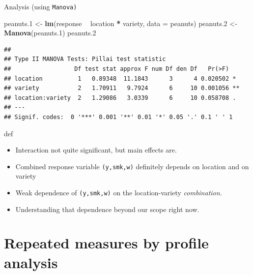 \documentclass[ignorenonframetext,]{beamer}
\newenvironment{Shaded}{\begin{snugshade}}{\end{snugshade}}
\newcommand{\DataTypeTok}[1]{\textcolor[rgb]{0.13,0.29,0.53}{#1}}
\newcommand{\FloatTok}[1]{\textcolor[rgb]{0.00,0.00,0.81}{#1}}
\newcommand{\KeywordTok}[1]{\textcolor[rgb]{0.13,0.29,0.53}{\textbf{#1}}}
\newcommand{\NormalTok}[1]{#1}
\newcommand{\OperatorTok}[1]{\textcolor[rgb]{0.81,0.36,0.00}{\textbf{#1}}}
\newcommand{\StringTok}[1]{\textcolor[rgb]{0.31,0.60,0.02}{#1}}
\begin{document}
\begin{frame}[fragile]{Analysis (using \texttt{Manova)}}
\protect\hypertarget{analysis-using-manova}{}

\begin{Shaded}
\begin{Highlighting}[]
\NormalTok{peanuts}\FloatTok{.1}\NormalTok{ <-}\StringTok{ }\KeywordTok{lm}\NormalTok{(response }\OperatorTok{~}\StringTok{ }\NormalTok{location }\OperatorTok{*}\StringTok{ }\NormalTok{variety, }\DataTypeTok{data =}\NormalTok{ peanuts)}
\NormalTok{peanuts}\FloatTok{.2}\NormalTok{ <-}\StringTok{ }\KeywordTok{Manova}\NormalTok{(peanuts}\FloatTok{.1}\NormalTok{)}
\NormalTok{peanuts}\FloatTok{.2}
\end{Highlighting}
\end{Shaded}

\begin{verbatim}
## 
## Type II MANOVA Tests: Pillai test statistic
##                  Df test stat approx F num Df den Df   Pr(>F)   
## location          1   0.89348  11.1843      3      4 0.020502 * 
## variety           2   1.70911   9.7924      6     10 0.001056 **
## location:variety  2   1.29086   3.0339      6     10 0.058708 . 
## ---
## Signif. codes:  0 '***' 0.001 '**' 0.01 '*' 0.05 '.' 0.1 ' ' 1
\end{verbatim}

def

\begin{itemize}
\item
  Interaction not quite significant, but main effects are.
\item
  Combined response variable \texttt{(y,smk,w)} definitely depends on
  location and on variety
\item
  Weak dependence of \texttt{(y,smk,w)} on the location-variety
  \emph{combination.}
\item
  Understanding that dependence beyond our scope right now.
\end{itemize}

\end{frame}

\hypertarget{repeated-measures-by-profile-analysis}{%
\section{Repeated measures by profile
analysis}\label{repeated-measures-by-profile-analysis}}
\end{document}
